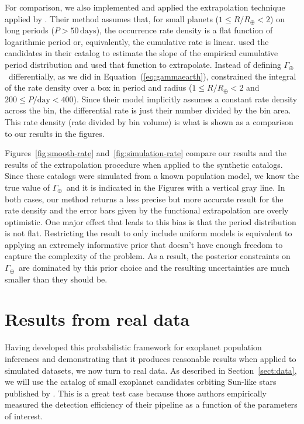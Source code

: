 \documentclass[12pt,preprint]{aastex}
\newcommand{\figref}[1]{\ref{fig:#1}}
\newcommand{\Eq}[1]{Equation~(\ref{eq:#1})}
\newcommand{\eq}[1]{\Eq{#1}}
\newcommand{\Sect}[1]{Section~\ref{sect:#1}}
\newcommand{\sect}[1]{\Sect{#1}}
\newcommand{\sectlabel}[1]{\label{sect:#1}}
\newcommand{\rate}{\ensuremath{\Gamma}}
\newcommand{\radius}{\ensuremath{R}}
\newcommand{\period}{\ensuremath{P}}
\newcommand{\gammaearth}{{\ensuremath{\rate_\oplus}}}
\begin{document}
For comparison, we also implemented and applied the extrapolation technique
applied by \citet{petigura}.
Their method assumes that, for small planets ($1 \le \radius/\radius_\oplus <
2$) on long periods ($\period > 50\,\mathrm{days}$), the occurrence rate
density is a flat function of logarithmic period or, equivalently, the
cumulative rate is linear.
\citet{petigura} used the candidates in their catalog to estimate the slope of
the empirical cumulative period distribution and used that function to
extrapolate.
Instead of defining \gammaearth\ differentially, as we did in \eq{gammaearth},
\citet{petigura} constrained the integral of the rate density over a box in
period and radius ($1 \le \radius/\radius_\oplus < 2$ and $200 \le
\period/\mathrm{day} < 400$).
Since their model implicitly assumes a constant rate density across the bin,
the differential rate is just their number divided by the bin area.
This rate density (rate divided by bin volume) is what is shown as a
comparison to our results in the figures.

Figures~\figref{smooth-rate} and~\figref{simulation-rate} compare our results
and the results of the \citet{petigura} extrapolation procedure when applied
to the synthetic catalogs.
Since these catalogs were simulated from a known population model, we know the
true value of \gammaearth\ and it is indicated in the Figures with a vertical
gray line.
In both cases, our method returns a less precise but more accurate result for
the rate density and the error bars given by the functional extrapolation
are overly optimistic.
One major effect that leads to this bias is that the period distribution is
not flat.
Restricting the result to only include uniform models is equivalent to
applying an extremely informative prior that doesn't have enough freedom to
capture the complexity of the problem.
As a result, the posterior constraints on \gammaearth\ are dominated by this
prior choice and the resulting uncertainties are much smaller than they should
be.

\section{Results from real data}
\sectlabel{real}

Having developed this probabilistic framework for exoplanet population
inferences and demonstrating that it produces reasonable results when applied
to simulated datasets, we now turn to real data.
As described in \sect{data}, we will use the catalog of small exoplanet
candidates orbiting Sun-like stars published by \citet{petigura}.
This is a great test case because those authors empirically measured the
detection efficiency of their pipeline as a function of the parameters of
interest.
\end{document}
